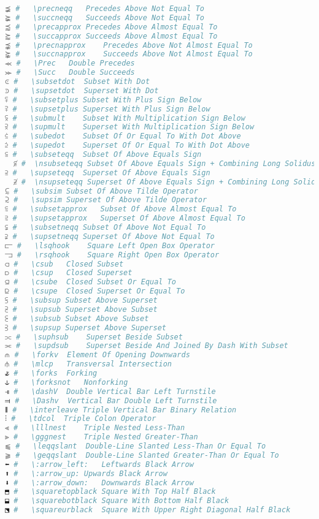 \begin{lstlisting}[language=Julia, linewidth=\textwidth]
⪵ #   \precneqq   Precedes Above Not Equal To
⪶ #   \succneqq   Succeeds Above Not Equal To
⪷ #   \precapprox Precedes Above Almost Equal To
⪸ #   \succapprox Succeeds Above Almost Equal To
⪹ #   \precnapprox    Precedes Above Not Almost Equal To
⪺ #   \succnapprox    Succeeds Above Not Almost Equal To
⪻ #   \Prec   Double Precedes
⪼ #   \Succ   Double Succeeds
⪽ #   \subsetdot  Subset With Dot
⪾ #   \supsetdot  Superset With Dot
⪿ #   \subsetplus Subset With Plus Sign Below
⫀ #   \supsetplus Superset With Plus Sign Below
⫁ #   \submult    Subset With Multiplication Sign Below
⫂ #   \supmult    Superset With Multiplication Sign Below
⫃ #   \subedot    Subset Of Or Equal To With Dot Above
⫄ #   \supedot    Superset Of Or Equal To With Dot Above
⫅ #   \subseteqq  Subset Of Above Equals Sign
  ⫅̸ #  \nsubseteqq Subset Of Above Equals Sign + Combining Long Solidus Overlay
⫆ #   \supseteqq  Superset Of Above Equals Sign
  ⫆̸ #  \nsupseteqq Superset Of Above Equals Sign + Combining Long Solidus Overlay
⫇ #   \subsim Subset Of Above Tilde Operator
⫈ #   \supsim Superset Of Above Tilde Operator
⫉ #   \subsetapprox   Subset Of Above Almost Equal To
⫊ #   \supsetapprox   Superset Of Above Almost Equal To
⫋ #   \subsetneqq Subset Of Above Not Equal To
⫌ #   \supsetneqq Superset Of Above Not Equal To
⫍ #   \lsqhook    Square Left Open Box Operator
⫎ #   \rsqhook    Square Right Open Box Operator
⫏ #   \csub   Closed Subset
⫐ #   \csup   Closed Superset
⫑ #   \csube  Closed Subset Or Equal To
⫒ #   \csupe  Closed Superset Or Equal To
⫓ #   \subsup Subset Above Superset
⫔ #   \supsub Superset Above Subset
⫕ #   \subsub Subset Above Subset
⫖ #   \supsup Superset Above Superset
⫗ #   \suphsub    Superset Beside Subset
⫘ #   \supdsub    Superset Beside And Joined By Dash With Subset
⫙ #   \forkv  Element Of Opening Downwards
⫛ #   \mlcp   Transversal Intersection
⫝̸ #   \forks  Forking
⫝ #   \forksnot   Nonforking
⫣ #   \dashV  Double Vertical Bar Left Turnstile
⫤ #   \Dashv  Vertical Bar Double Left Turnstile
⫴ #   \interleave Triple Vertical Bar Binary Relation
⫶ #   \tdcol  Triple Colon Operator
⫷ #   \lllnest    Triple Nested Less-Than
⫸ #   \gggnest    Triple Nested Greater-Than
⫹ #   \leqqslant  Double-Line Slanted Less-Than Or Equal To
⫺ #   \geqqslant  Double-Line Slanted Greater-Than Or Equal To
⬅ #   \:arrow_left:   Leftwards Black Arrow
⬆ #   \:arrow_up: Upwards Black Arrow
⬇ #   \:arrow_down:   Downwards Black Arrow
⬒ #   \squaretopblack Square With Top Half Black
⬓ #   \squarebotblack Square With Bottom Half Black
⬔ #   \squareurblack  Square With Upper Right Diagonal Half Black

\end{lstlisting}
